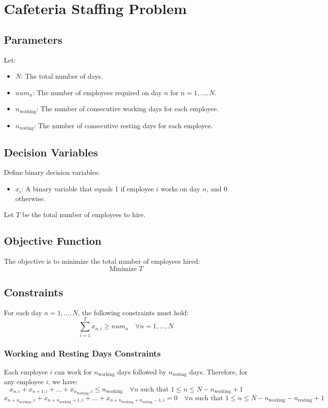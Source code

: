 \documentclass{article}
\begin{document}
\section*{Cafeteria Staffing Problem}

\subsection*{Parameters}
Let:
\begin{itemize}
    \item $N$: The total number of days.
    \item $num_n$: The number of employees required on day $n$ for $n = 1, \ldots, N$.
    \item $n_{\text{working}}$: The number of consecutive working days for each employee.
    \item $n_{\text{resting}}$: The number of consecutive resting days for each employee.
\end{itemize}

\subsection*{Decision Variables}
Define binary decision variables:
\begin{itemize}
    \item $x_i$: A binary variable that equals 1 if employee $i$ works on day $n$, and 0 otherwise.
\end{itemize}

Let $T$ be the total number of employees to hire.

\subsection*{Objective Function}
The objective is to minimize the total number of employees hired:
\[
\text{Minimize } T
\]

\subsection*{Constraints}
For each day $n = 1, \ldots, N$, the following constraints must hold:
\[
\sum_{i=1}^{T} x_{n,i} \geq num_n \quad \forall n = 1, \ldots, N
\]

\subsubsection*{Working and Resting Days Constraints}
Each employee $i$ can work for $n_{\text{working}}$ days followed by $n_{\text{resting}}$ days. Therefore, for any employee $i$, we have:
\[
x_{n,i} + x_{n+1,i} + \ldots + x_{n_{\text{working}},i} \leq n_{\text{working}} \quad \forall n \text{ such that } 1 \leq n \leq N - n_{\text{working}} + 1
\]
\[
x_{n+ n_{\text{working}},i} + x_{n+ n_{\text{working}} + 1,i} + \ldots + x_{n+ n_{\text{working}} + n_{\text{resting}} - 1,i} = 0 \quad \forall n \text{ such that } 1 \leq n \leq N - n_{\text{working}} - n_{\text{resting}} + 1
\]
\end{document}
